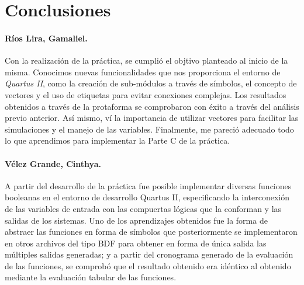 \documentclass[../main.tex]{subfiles}
\begin{document}
\clearpage
\section{Conclusiones}
\paragraph{Ríos Lira, Gamaliel.} Con la realización de la práctica, se cumplió 
el objtivo planteado al inicio de la misma. Conocimos nuevas funcionalidades 
que nos proporciona el entorno de \textit{Quartus II}, como la creación de 
sub-módulos a través de símbolos, el concepto de vectores y el uso de 
etiquetas para evitar conexiones complejas. Los resultados obtenidos a través 
de la protaforma se comprobaron con éxito a través del análisis previo 
anterior.  Así mismo, ví la importancia de utilizar vectores para facilitar 
las simulaciones y el manejo de las variables. Finalmente, me pareció adecuado 
todo lo que aprendimos para implementar la Parte C de la práctica.

\paragraph{Vélez Grande, Cinthya.} A partir del desarrollo de la práctica fue 
posible implementar diversas funciones booleanas en el entorno de desarrollo 
Quartus II, especificando la interconexión de las variables de entrada con las 
compuertas lógicas que la conforman y las salidas de los sistemas.  Uno de los 
aprendizajes obtenidos fue la forma de abstraer las funciones en forma de 
símbolos que posteriormente se implementaron en otros archivos del tipo BDF 
para obtener en forma de única salida las múltiples salidas generadas; y a 
partir del cronograma generado de la evaluación de las funciones, se comprobó 
que el resultado obtenido era idéntico al obtenido mediante la evaluación 
tabular de las funciones.
\end{document}
